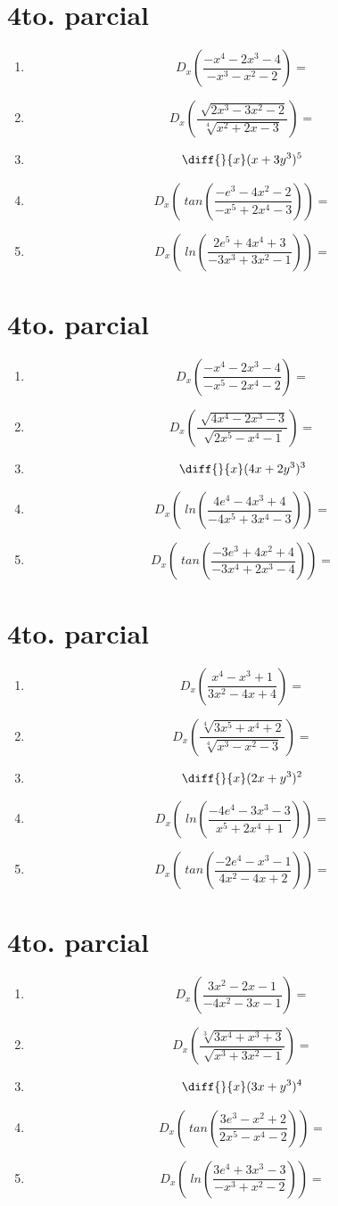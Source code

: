 \documentclass[oneside,spanish,letter]{article}
\begin{document}
\section{4to. parcial}
\begin{enumerate}
 \item $$ D_x \left( \frac{-x^4-2x^3-4}{-x^3-x^2-2}\right)=$$
 \item $$ D_x \left( \frac{\sqrt[]{2x^3-3x^2-2}}{\sqrt[4]{x^2+2x-3}}\right)=$$
\item $$\diff{}{x}(x+3y^3)^5$$
 \item $$ D_x \left(\;tan\left( \frac{-e^3-4x^2-2}{-x^5+2x^4-3}\right)\right)=$$
 \item $$ D_x \left(\;ln\left( \frac{2e^5+4x^4+3}{-3x^3+3x^2-1}\right)\right)=$$
 \end{enumerate}
  \newpage
\section{4to. parcial}
\begin{enumerate}
 \item $$ D_x \left( \frac{-x^4-2x^3-4}{-x^5-2x^4-2}\right)=$$
 \item $$ D_x \left( \frac{\sqrt[]{4x^4-2x^3-3}}{\sqrt[]{2x^5-x^4-1}}\right)=$$
\item $$\diff{}{x}(4x+2y^3)^3$$
 \item $$ D_x \left(\;ln\left( \frac{4e^4-4x^3+4}{-4x^5+3x^4-3}\right)\right)=$$
 \item $$ D_x \left(\;tan\left( \frac{-3e^3+4x^2+4}{-3x^4+2x^3-4}\right)\right)=$$
 \end{enumerate}
  \newpage
\section{4to. parcial}
\begin{enumerate}
 \item $$ D_x \left( \frac{x^4-x^3+1}{3x^2-4x+4}\right)=$$
 \item $$ D_x \left( \frac{\sqrt[4]{3x^5+x^4+2}}{\sqrt[4]{x^3-x^2-3}}\right)=$$
\item $$\diff{}{x}(2x+y^3)^2$$
 \item $$ D_x \left(\;ln\left( \frac{-4e^4-3x^3-3}{x^5+2x^4+1}\right)\right)=$$
 \item $$ D_x \left(\;tan\left( \frac{-2e^4-x^3-1}{4x^2-4x+2}\right)\right)=$$
 \end{enumerate}
  \newpage
\section{4to. parcial}
\begin{enumerate}
 \item $$ D_x \left( \frac{3x^2-2x-1}{-4x^2-3x-1}\right)=$$
 \item $$ D_x \left( \frac{\sqrt[3]{3x^4+x^3+3}}{\sqrt[]{x^3+3x^2-1}}\right)=$$
\item $$\diff{}{x}(3x+y^3)^4$$
 \item $$ D_x \left(\;tan\left( \frac{3e^3-x^2+2}{2x^5-x^4-2}\right)\right)=$$
 \item $$ D_x \left(\;ln\left( \frac{3e^4+3x^3-3}{-x^3+x^2-2}\right)\right)=$$
 \end{enumerate}
  \newpage
\end{document}
